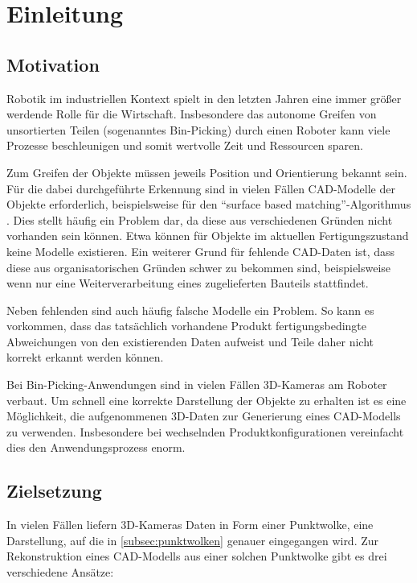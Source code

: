 
\chapter{Einleitung}
\label{ch:einleitung}


\section{Motivation}
\label{sec:motivation}

Robotik im industriellen Kontext spielt in den letzten Jahren eine immer größer werdende Rolle für die Wirtschaft.
Insbesondere das autonome Greifen von unsortierten Teilen (sogenanntes Bin-Picking) durch einen Roboter kann viele Prozesse beschleunigen und somit wertvolle Zeit und Ressourcen sparen.

Zum Greifen der Objekte müssen jeweils Position und Orientierung bekannt sein.
Für die dabei durchgeführte Erkennung sind in vielen Fällen CAD-Modelle der Objekte erforderlich, beispielsweise für den ``surface based matching''-Algorithmus \cite{drost2014recognition}.
Dies stellt häufig ein Problem dar, da diese aus verschiedenen Gründen nicht vorhanden sein können.
Etwa können für Objekte im aktuellen Fertigungszustand keine Modelle existieren.
Ein weiterer Grund für fehlende CAD-Daten ist, dass diese aus organisatorischen Gründen schwer zu bekommen sind, beispielsweise wenn nur eine Weiterverarbeitung eines zugelieferten Bauteils stattfindet.

Neben fehlenden sind auch häufig falsche Modelle ein Problem.
So kann es vorkommen, dass das tatsächlich vorhandene Produkt fertigungsbedingte Abweichungen von den existierenden Daten aufweist und Teile daher nicht korrekt erkannt werden können.

Bei Bin-Picking-Anwendungen sind in vielen Fällen 3D-Kameras am Roboter verbaut.
Um schnell eine korrekte Darstellung der Objekte zu erhalten ist es eine Möglichkeit, die aufgenommenen 3D-Daten zur Generierung eines CAD-Modells zu verwenden.
Insbesondere bei wechselnden Produktkonfigurationen vereinfacht dies den Anwendungsprozess enorm.



\section{Zielsetzung}
\label{sec:zielsetzung}

In vielen Fällen liefern 3D-Kameras Daten in Form einer Punktwolke, eine Darstellung, auf die in \ref{subsec:punktwolken} genauer eingegangen wird.
Zur Rekonstruktion eines CAD-Modells aus einer solchen Punktwolke gibt es drei verschiedene Ansätze:

